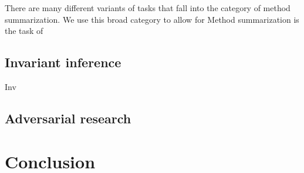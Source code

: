 \documentclass[sigconf,authordraft=true,nonacm=true]{acmart}
\begin{document}
There are many different variants of tasks that fall into the category of method summarization.
We use this broad category to allow for
Method summarization is the task of


\subsection{Invariant inference}
Inv

\subsection{Adversarial research}

\section{Conclusion}

\FloatBarrier



\end{document}
